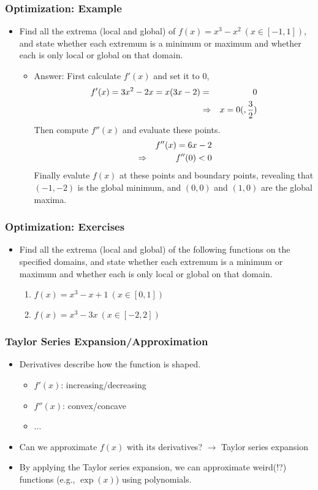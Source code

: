 \documentclass[pdflatex, 12pt]{beamer}
\begin{document}
\begin{frame}
\frametitle{Optimization: Example}
\begin{itemize}
\item Find all the extrema (local and global) of $f(x) = x^3 - x^2 \ (x \in [-1, 1])$, and state whether each extremum is a minimum or maximum and whether each is only local or global on that domain.
 \begin{itemize}
 \item Answer: First calculate $f'(x)$ and set it to 0,
  \begin{eqnarray}
  f'(x) = 3x^2 - 2x = x(3x - 2) &=& 0 \notag \\
  &\Rightarrow& x = 0 (, \frac{3}{2}) \notag
  \end{eqnarray}
 Then compute $f''(x)$ and evaluate these points.
  \begin{eqnarray}
  && f''(x) = 6x - 2 \notag \\
  &\Rightarrow& f''(0) < 0 \notag
  \end{eqnarray}
 Finally evalute $f(x)$ at these points and boundary points, revealing that $(-1, -2)$ is the global minimum, and $(0 ,0 )$ and $(1, 0)$ are the global maxima.
 \end{itemize}
\end{itemize}
\end{frame}

\begin{frame}
\frametitle{Optimization: Exercises}
\begin{itemize}
\item Find all the extrema (local and global) of the following functions on the specified domains, and state whether each extremum is a minimum or maximum and whether each is only local or global on that domain.
 \begin{enumerate}
 \item $f(x) = x^3 - x + 1 \ (x \in [0, 1])$
 \item $f(x) = x^3 - 3x \ (x \in [-2, 2])$
 \end{enumerate}
\end{itemize}
\end{frame}

\begin{frame}
\frametitle{Taylor Series Expansion/Approximation}
\begin{itemize}
\item Derivatives describe how the function is shaped.
 \begin{itemize}
 \item $f'(x)$: increasing/decreasing
 \item $f''(x)$: convex/concave
 \item ...
 \end{itemize}
\vspace{0.4cm}
\item Can we approximate $f(x)$ with its derivatives? $\rightarrow$ Taylor series expansion
\vspace{0.4cm}
\item By applying the Taylor series expansion, we can approximate weird(!?) functions (e.g., $\exp(x)$) using polynomials. 
\end{itemize}
\end{frame}
\end{document}
